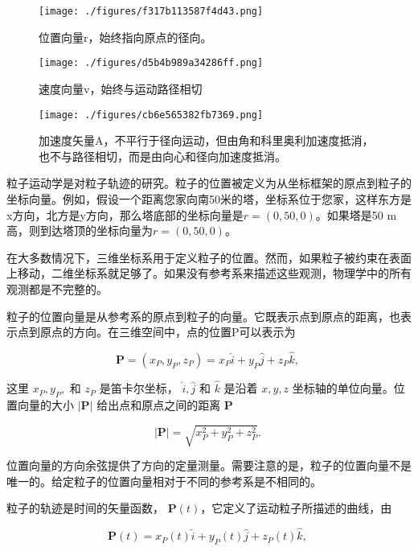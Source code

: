 \begin{figure}[ht]
\centering
\texttt{[image: ./figures/f317b113587f4d43.png]}
\caption{位置向量r，始终指向原点的径向。} \label{fig_YDX_4}
\end{figure}

\begin{figure}[ht]
\centering
\texttt{[image: ./figures/d5b4b989a34286ff.png]}
\caption{速度向量v，始终与运动路径相切} \label{fig_YDX_5}
\end{figure}

\begin{figure}[ht]
\centering
\texttt{[image: ./figures/cb6e565382fb7369.png]}
\caption{加速度矢量A，不平行于径向运动，但由角和科里奥利加速度抵消，也不与路径相切，而是由向心和径向加速度抵消。} \label{fig_YDX_6}
\end{figure}

粒子运动学是对粒子轨迹的研究。粒子的位置被定义为从坐标框架的原点到粒子的坐标向量。例如，假设一个距离您家向南50米的塔，坐标系位于您家，这样东方是x方向，北方是y方向，那么塔底部的坐标向量是$r=(0,50,0)$。如果塔是50 m高，则到达塔顶的坐标向量为$r=(0,50,0)$。

在大多数情况下，三维坐标系用于定义粒子的位置。然而，如果粒子被约束在表面上移动，二维坐标系就足够了。如果没有参考系来描述这些观测，物理学中的所有观测都是不完整的。

粒子的位置向量是从参考系的原点到粒子的向量。它既表示点到原点的距离，也表示点到原点的方向。在三维空间中，点的位置P可以表示为

\begin{equation}
\mathbf{P} = (x_P, y_P, z_P) = x_P \hat{i} + y_P \hat{j} + z_P \hat{k},~
\end{equation}

这里 $x_P, y_P,$ 和 $z_P$ 是笛卡尔坐标， $\hat{i}, \hat{j}$ 和 $\hat{k}$ 是沿着 $x, y, z$ 坐标轴的单位向量。位置向量的大小 $\left| \mathbf{P} \right|$ 给出点和原点之间的距离 $\mathbf{P}$

\begin{equation}
\left| \mathbf{P} \right| = \sqrt{x_P^2 + y_P^2 + z_P^2}.~
\end{equation}

位置向量的方向余弦提供了方向的定量测量。需要注意的是，粒子的位置向量不是唯一的。给定粒子的位置向量相对于不同的参考系是不相同的。

粒子的轨迹是时间的矢量函数， $\mathbf{P}(t)$，它定义了运动粒子所描述的曲线，由

\begin{equation}
\mathbf{P}(t) = x_P(t) \hat{i} + y_P(t) \hat{j} + z_P(t) \hat{k},~
\end{equation}

